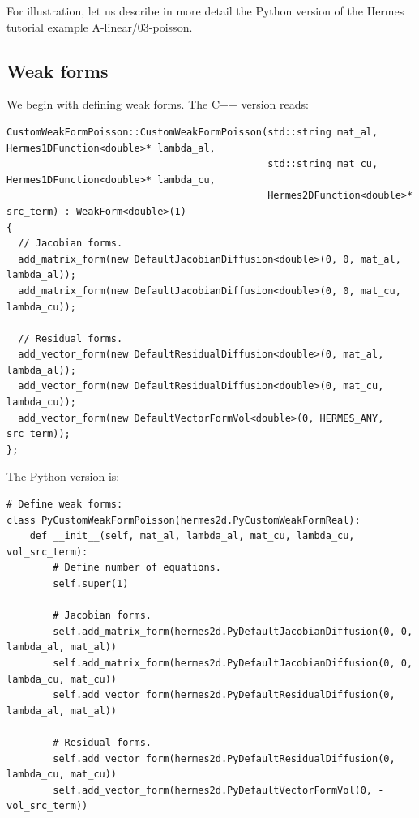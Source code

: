 \documentclass{article}
\begin{document}
For illustration, let us describe in more detail the Python version 
of the Hermes tutorial example A-linear/03-poisson. 

\subsection*{Weak forms}

We begin with defining weak forms. The C++ version reads:

{\small
\begin{verbatim}
CustomWeakFormPoisson::CustomWeakFormPoisson(std::string mat_al, Hermes1DFunction<double>* lambda_al,
                                             std::string mat_cu, Hermes1DFunction<double>* lambda_cu,
                                             Hermes2DFunction<double>* src_term) : WeakForm<double>(1)
{
  // Jacobian forms.
  add_matrix_form(new DefaultJacobianDiffusion<double>(0, 0, mat_al, lambda_al));
  add_matrix_form(new DefaultJacobianDiffusion<double>(0, 0, mat_cu, lambda_cu));

  // Residual forms.
  add_vector_form(new DefaultResidualDiffusion<double>(0, mat_al, lambda_al));
  add_vector_form(new DefaultResidualDiffusion<double>(0, mat_cu, lambda_cu));
  add_vector_form(new DefaultVectorFormVol<double>(0, HERMES_ANY, src_term));
};

\end{verbatim}
}
The Python version is:
{\small
\begin{verbatim}
# Define weak forms:
class PyCustomWeakFormPoisson(hermes2d.PyCustomWeakFormReal):
    def __init__(self, mat_al, lambda_al, mat_cu, lambda_cu, vol_src_term):
        # Define number of equations.
        self.super(1)

        # Jacobian forms.
        self.add_matrix_form(hermes2d.PyDefaultJacobianDiffusion(0, 0, lambda_al, mat_al))
        self.add_matrix_form(hermes2d.PyDefaultJacobianDiffusion(0, 0, lambda_cu, mat_cu))
        self.add_vector_form(hermes2d.PyDefaultResidualDiffusion(0, lambda_al, mat_al))

        # Residual forms.
        self.add_vector_form(hermes2d.PyDefaultResidualDiffusion(0, lambda_cu, mat_cu))
        self.add_vector_form(hermes2d.PyDefaultVectorFormVol(0, -vol_src_term))
\end{verbatim}
}


\begin{verbatim}


\end{verbatim}

\begin{verbatim}


\end{verbatim}

\begin{verbatim}


\end{verbatim}

\begin{verbatim}


\end{verbatim}

\begin{verbatim}


\end{verbatim}
\end{document}
